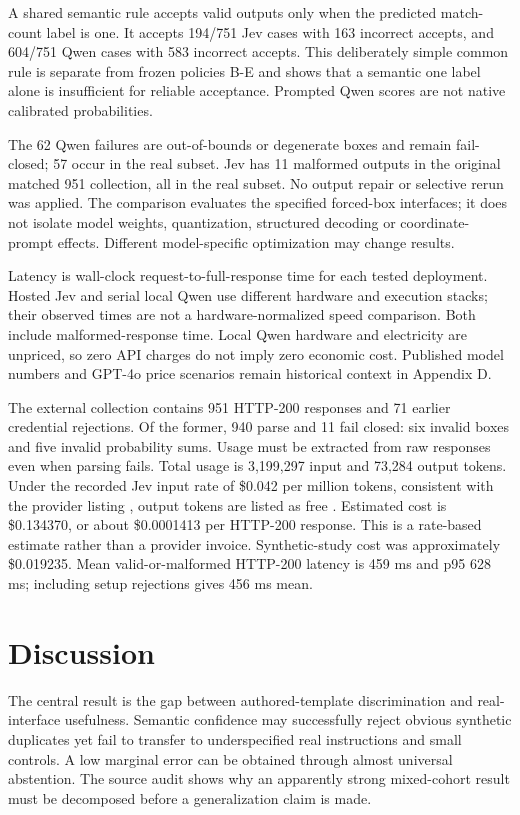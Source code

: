 \documentclass[10pt]{article}
\begin{document}
A shared semantic rule accepts valid outputs only when the predicted match-count label is one. It accepts 194/751 Jev cases with 163 incorrect accepts, and 604/751 Qwen cases with 583 incorrect accepts. This deliberately simple common rule is separate from frozen policies B-E and shows that a semantic one label alone is insufficient for reliable acceptance. Prompted Qwen scores are not native calibrated probabilities.

The 62 Qwen failures are out-of-bounds or degenerate boxes and remain fail-closed; 57 occur in the real subset. Jev has 11 malformed outputs in the original matched 951 collection, all in the real subset. No output repair or selective rerun was applied. The comparison evaluates the specified forced-box interfaces; it does not isolate model weights, quantization, structured decoding or coordinate-prompt effects. Different model-specific optimization may change results.

Latency is wall-clock request-to-full-response time for each tested deployment. Hosted Jev and serial local Qwen use different hardware and execution stacks; their observed times are not a hardware-normalized speed comparison. Both include malformed-response time. Local Qwen hardware and electricity are unpriced, so zero API charges do not imply zero economic cost. Published model numbers and GPT-4o price scenarios remain historical context in Appendix D.

The external collection contains 951 HTTP-200 responses and 71 earlier credential rejections. Of the former, 940 parse and 11 fail closed: six invalid boxes and five invalid probability sums. Usage must be extracted from raw responses even when parsing fails. Total usage is 3,199,297 input and 73,284 output tokens. Under the recorded Jev input rate of \$0.042 per million tokens, consistent with the provider listing \citep{ref9}, output tokens are listed as free \citep{ref9}. Estimated cost is \$0.134370, or about \$0.0001413 per HTTP-200 response. This is a rate-based estimate rather than a provider invoice. Synthetic-study cost was approximately \$0.019235. Mean valid-or-malformed HTTP-200 latency is 459 ms and p95 628 ms; including setup rejections gives 456 ms mean.

\section*{Discussion}
The central result is the gap between authored-template discrimination and real-interface usefulness. Semantic confidence may successfully reject obvious synthetic duplicates yet fail to transfer to underspecified real instructions and small controls. A low marginal error can be obtained through almost universal abstention. The source audit shows why an apparently strong mixed-cohort result must be decomposed before a generalization claim is made.
\end{document}
